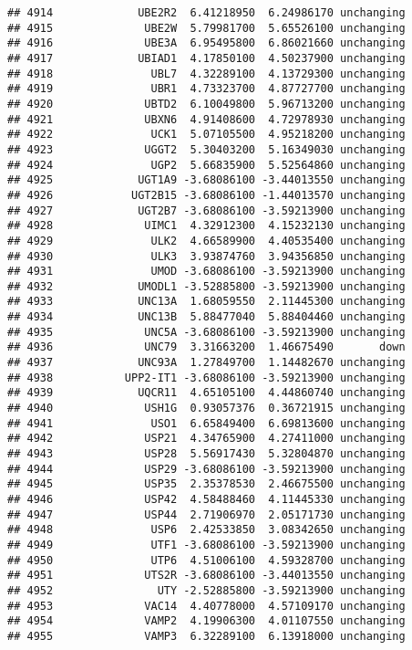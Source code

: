 \documentclass[]{article}
\begin{document}
\begin{verbatim}
## 4914             UBE2R2  6.41218950  6.24986170 unchanging
## 4915              UBE2W  5.79981700  5.65526100 unchanging
## 4916              UBE3A  6.95495800  6.86021660 unchanging
## 4917             UBIAD1  4.17850100  4.50237900 unchanging
## 4918               UBL7  4.32289100  4.13729300 unchanging
## 4919               UBR1  4.73323700  4.87727700 unchanging
## 4920              UBTD2  6.10049800  5.96713200 unchanging
## 4921              UBXN6  4.91408600  4.72978930 unchanging
## 4922               UCK1  5.07105500  4.95218200 unchanging
## 4923              UGGT2  5.30403200  5.16349030 unchanging
## 4924               UGP2  5.66835900  5.52564860 unchanging
## 4925             UGT1A9 -3.68086100 -3.44013550 unchanging
## 4926            UGT2B15 -3.68086100 -1.44013570 unchanging
## 4927             UGT2B7 -3.68086100 -3.59213900 unchanging
## 4928              UIMC1  4.32912300  4.15232130 unchanging
## 4929               ULK2  4.66589900  4.40535400 unchanging
## 4930               ULK3  3.93874760  3.94356850 unchanging
## 4931               UMOD -3.68086100 -3.59213900 unchanging
## 4932             UMODL1 -3.52885800 -3.59213900 unchanging
## 4933             UNC13A  1.68059550  2.11445300 unchanging
## 4934             UNC13B  5.88477040  5.88404460 unchanging
## 4935              UNC5A -3.68086100 -3.59213900 unchanging
## 4936              UNC79  3.31663200  1.46675490       down
## 4937             UNC93A  1.27849700  1.14482670 unchanging
## 4938           UPP2-IT1 -3.68086100 -3.59213900 unchanging
## 4939             UQCR11  4.65105100  4.44860740 unchanging
## 4940              USH1G  0.93057376  0.36721915 unchanging
## 4941               USO1  6.65849400  6.69813600 unchanging
## 4942              USP21  4.34765900  4.27411000 unchanging
## 4943              USP28  5.56917430  5.32804870 unchanging
## 4944              USP29 -3.68086100 -3.59213900 unchanging
## 4945              USP35  2.35378530  2.46675500 unchanging
## 4946              USP42  4.58488460  4.11445330 unchanging
## 4947              USP44  2.71906970  2.05171730 unchanging
## 4948               USP6  2.42533850  3.08342650 unchanging
## 4949               UTF1 -3.68086100 -3.59213900 unchanging
## 4950               UTP6  4.51006100  4.59328700 unchanging
## 4951              UTS2R -3.68086100 -3.44013550 unchanging
## 4952                UTY -2.52885800 -3.59213900 unchanging
## 4953              VAC14  4.40778000  4.57109170 unchanging
## 4954              VAMP2  4.19906300  4.01107550 unchanging
## 4955              VAMP3  6.32289100  6.13918000 unchanging

\end{verbatim}
\end{document}
